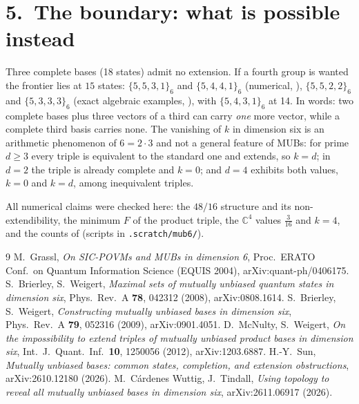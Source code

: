 \documentclass[10pt]{article}
\newcommand{\C}{\mathbb{C}}
\begin{document}
\section*{5.\ The boundary: what is possible instead}

Three complete bases (18 states) admit no extension. If a fourth group is wanted the frontier lies at
$15$ states: $\{5,5,3,1\}_6$ and $\{5,4,4,1\}_6$ (numerical, \cite{BW08}), $\{5,5,2,2\}_6$ and
$\{5,3,3,3\}_6$ (exact algebraic examples, \cite{CWT26}), with $\{5,4,3,1\}_6$ at 14. In words: two
complete bases plus three vectors of a third can carry \emph{one} more vector, while a complete third
basis carries none. The vanishing of $k$ in dimension six is an arithmetic phenomenon of $6=2\cdot3$
and not a general feature of MUBs: for prime $d\ge3$ every triple is equivalent to the standard one and
extends, so $k=d$; in $d=2$ the triple is already complete and $k=0$; and $d=4$ exhibits both values,
$k=0$ and $k=d$, among inequivalent triples.

\vspace{2pt}
{\footnotesize\noindent All numerical claims were checked here: the $48/16$ structure and its
non-extendibility, the minimum $F$ of the product triple, the $\C^4$ values $\tfrac{3}{16}$ and $k=4$,
and the counts of \cite{BW09} (scripts in \texttt{.scratch/mub6/}).}

\begingroup\footnotesize
\begin{thebibliography}{9}\setlength{\itemsep}{0pt}
 M.~Grassl, \emph{On SIC-POVMs and MUBs in dimension 6}, Proc.\ ERATO Conf.\ on
Quantum Information Science (EQUIS 2004), arXiv:quant-ph/0406175.
 S.~Brierley, S.~Weigert, \emph{Maximal sets of mutually unbiased quantum states in
dimension six}, Phys.\ Rev.\ A \textbf{78}, 042312 (2008), arXiv:0808.1614.
 S.~Brierley, S.~Weigert, \emph{Constructing mutually unbiased bases in dimension six},
Phys.\ Rev.\ A \textbf{79}, 052316 (2009), arXiv:0901.4051.
 D.~McNulty, S.~Weigert, \emph{On the impossibility to extend triples of mutually unbiased
product bases in dimension six}, Int.\ J.\ Quant.\ Inf.\ \textbf{10}, 1250056 (2012), arXiv:1203.6887.
 H.-Y.~Sun, \emph{Mutually unbiased bases: common states, completion, and extension
obstructions}, arXiv:2610.12180 (2026).
 M.~C\'ardenes Wuttig, J.~Tindall, \emph{Using topology to reveal all mutually unbiased
bases in dimension six}, arXiv:2611.06917 (2026).
\end{thebibliography}
\endgroup
\end{document}
